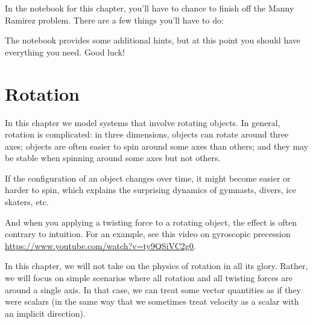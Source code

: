 \documentclass[12pt]{book}
\theoremstyle{exercise}
\newcommand{\py}{\verb}%}
\begin{document}
In the notebook for this chapter, you'll have to chance to finish off the Manny Ramirez problem.  There are a few things you'll have to do:


The notebook provides some additional hints, but at this point you should have everything you need.  Good luck!


\chapter{Rotation}

In this chapter we model systems that involve rotating objects.  In general, rotation is complicated:  in three dimensions, objects can rotate around three axes; objects are often easier to spin around some axes than others; and they may be stable when spinning around some axes but not others.  

If the configuration of an object changes over time, it might become easier or harder to spin, which explains the surprising dynamics of gymnasts, divers, ice skaters, etc.

And when you applying a twisting force to a rotating object, the effect is often contrary to intuition.  For an example, see this video on gyroscopic precession \url{https://www.youtube.com/watch?v=ty9QSiVC2g0}.

In this chapter, we will not take on the physics of rotation in all its glory.  Rather, we will focus on simple scenarios where all rotation and all twisting forces are around a single axis.  In that case, we can treat some vector quantities as if they were scalars (in the same way that we sometimes treat velocity as a scalar with an implicit direction).
\end{document}
